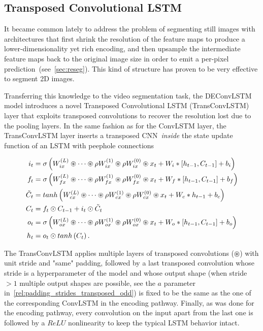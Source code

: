 \subsection{Transposed Convolutional LSTM}

It became common lately to address the problem of segmenting still images
with architectures that first shrink the resolution of the feature maps to
produce a lower-dimensionality yet rich encoding, and then upsample the
intermediate feature maps back to the original image size in order to emit a
per-pixel prediction~(see~\autoref{sec:reseg}). This kind of structure has
proven to be very effective to segment 2D images.

Transferring this knowledge to the video segmentation task, the DEConvLSTM
model introduces a novel Transposed Convolutional LSTM (TransConvLSTM) layer
that exploits transposed convolutions to recover the resolution lost due to the
pooling layers. In the same fashion as for the ConvLSTM layer, the
TransConvLSTM layer inserts a transposed CNN~\emph{inside} the state update
function of an LSTM with peephole connections

\begin{equation}\label{eq:deconvLSTM_dec}
\begin{split}
    i_t &= \sigma\left(W_{ix}^{(L)} \circledast \dots \circledast
        \rho W_{ix}^{(1)} \circledast \rho W_{ix}^{(0)} \circledast x_t +
        W_i * \left[h_{t-1}, C_{t-1}\right] + b_i \right)\\
    f_t &= \sigma\left(W_{fx}^{(L)} \circledast \dots \circledast
        \rho W_{fx}^{(1)} \circledast \rho W_{fx}^{(0)} \circledast x_t +
        W_f * \left[h_{t-1}, C_{t-1}\right] + b_f \right)\\
    \tilde C_t &= tanh \left(W_{cx}^{(L)} \circledast \dots \circledast
        \rho W_{cx}^{(1)} \circledast \rho W_{cx}^{(0)} \circledast x_t +
        W_c * h_{t-1} + b_c \right)\\
    C_t &= f_t \odot C_{t-1} + i_t \odot \tilde C_t\\
    o_t &= \sigma\left(W_{ox}^{(L)} \circledast \dots \circledast
        \rho W_{ox}^{(1)} \circledast \rho W_{ox}^{(0)} \circledast x_t +
        W_o * \left[h_{t-1}, C_{t-1}\right] + b_o \right)\\
    h_t &= o_t \odot tanh \left(C_t\right).
\end{split}
\end{equation}

\noindent The TransConvLSTM applies multiple layers of transposed convolutions
($\circledast$) with unit stride and "same" padding, followed by a last
transposed convolution whose stride is a hyperparameter of the model and whose
output shape (when stride $> 1$ multiple output shapes are possible, see the
$a$ parameter in~\autoref{rel:padding_strides_transposed_odd}) is fixed to be
the same as the one of the corresponding ConvLSTM in the encoding pathway.
Finally, as was done for the encoding pathway, every convolution on the input
apart from the last one is followed by a $ReLU$ nonlinearity to keep the
typical LSTM behavior intact.

